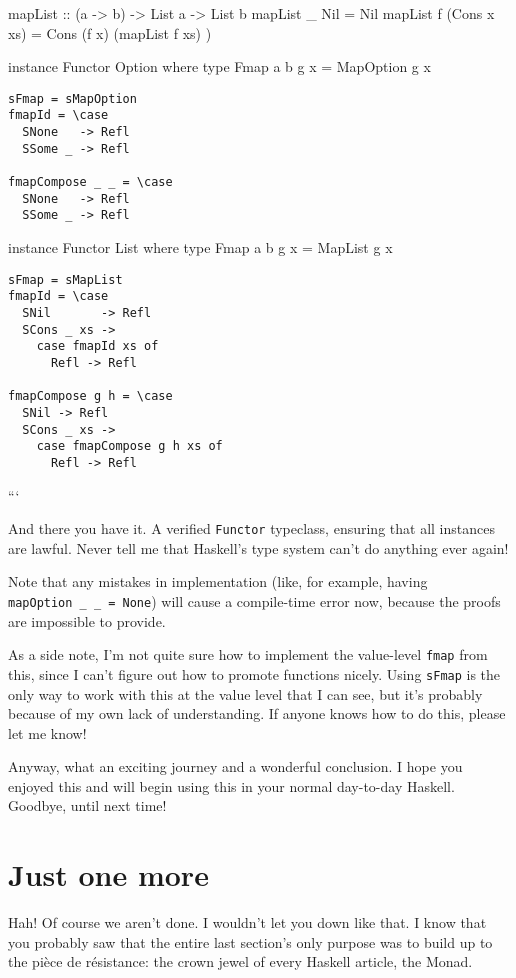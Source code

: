 \documentclass[]{article}
\begin{document}
mapList :: (a -\textgreater{} b) -\textgreater{} List a -\textgreater{} List b
mapList \_ Nil = Nil mapList f (Cons x xs) = Cons (f x) (mapList f xs)
\textbar{}{]})

instance Functor Option where type Fmap a b g x = MapOption g x

\begin{verbatim}
sFmap = sMapOption
fmapId = \case
  SNone   -> Refl
  SSome _ -> Refl

fmapCompose _ _ = \case
  SNone   -> Refl
  SSome _ -> Refl
\end{verbatim}

instance Functor List where type Fmap a b g x = MapList g x

\begin{verbatim}
sFmap = sMapList
fmapId = \case
  SNil       -> Refl
  SCons _ xs ->
    case fmapId xs of
      Refl -> Refl

fmapCompose g h = \case
  SNil -> Refl
  SCons _ xs ->
    case fmapCompose g h xs of
      Refl -> Refl
\end{verbatim}

```

And there you have it. A verified \texttt{Functor} typeclass, ensuring that all
instances are lawful. Never tell me that Haskell's type system can't do anything
ever again!

Note that any mistakes in implementation (like, for example, having
\texttt{mapOption\ \_\ \_\ =\ None}) will cause a compile-time error now,
because the proofs are impossible to provide.

As a side note, I'm not quite sure how to implement the value-level
\texttt{fmap} from this, since I can't figure out how to promote functions
nicely. Using \texttt{sFmap} is the only way to work with this at the value
level that I can see, but it's probably because of my own lack of understanding.
If anyone knows how to do this, please let me know!

Anyway, what an exciting journey and a wonderful conclusion. I hope you enjoyed
this and will begin using this in your normal day-to-day Haskell. Goodbye, until
next time!

\section{Just one more}

Hah! Of course we aren't done. I wouldn't let you down like that. I know that
you probably saw that the entire last section's only purpose was to build up to
the pièce de résistance: the crown jewel of every Haskell article, the Monad.
\end{document}
